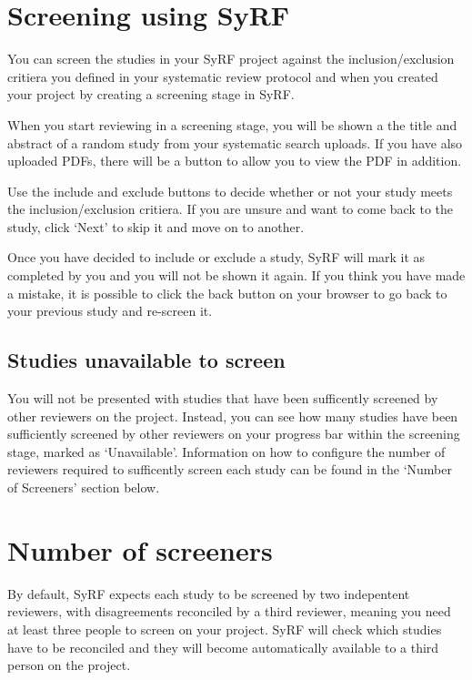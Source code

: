 \documentclass[
]{book}
\begin{document}
\hypertarget{screening-using-syrf}{%
\section{Screening using SyRF}\label{screening-using-syrf}}

You can screen the studies in your SyRF project against the inclusion/exclusion critiera you defined in your systematic review protocol and when you created your project by creating a screening stage in SyRF.

When you start reviewing in a screening stage, you will be shown a the title and abstract of a random study from your systematic search uploads. If you have also uploaded PDFs, there will be a button to allow you to view the PDF in addition.

Use the include and exclude buttons to decide whether or not your study meets the inclusion/exclusion critiera. If you are unsure and want to come back to the study, click `Next' to skip it and move on to another.

Once you have decided to include or exclude a study, SyRF will mark it as completed by you and you will not be shown it again. If you think you have made a mistake, it is possible to click the back button on your browser to go back to your previous study and re-screen it.

\hypertarget{studies-unavailable-to-screen}{%
\subsection{Studies unavailable to screen}\label{studies-unavailable-to-screen}}

You will not be presented with studies that have been sufficently screened by other reviewers on the project. Instead, you can see how many studies have been sufficiently screened by other reviewers on your progress bar within the screening stage, marked as `Unavailable'. Information on how to configure the number of reviewers required to sufficently screen each study can be found in the `Number of Screeners' section below.

\hypertarget{number-of-screeners}{%
\section{Number of screeners}\label{number-of-screeners}}

By default, SyRF expects each study to be screened by two indepentent reviewers, with disagreements reconciled by a third reviewer, meaning you need at least three people to screen on your project. SyRF will check which studies have to be reconciled and they will become automatically available to a third person on the project.
\end{document}
